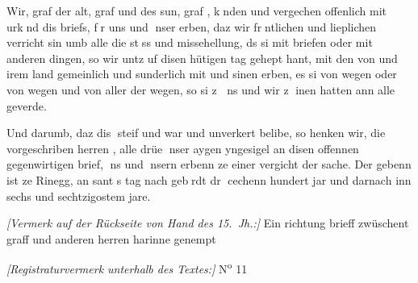 \documentclass[10pt,twoside]{article}
\begin{document}
\begin{source}

               
                  
                  
                     
                        Wir, graf 
                        der alt, graf  und
                           \leavevmode{}des sun, graf , knden und vergechen offenlich mit urknd dis briefs,
                        fr uns und nser erben, daz wir frntlichen und lieplichen verricht
                        sin umb alle die stss und missehellung, ds si mit briefen oder mit
                        anderen dingen, so wir untz uf disen hütigen tag gehept
                        hant, mit den von  und irem land
                        gemeinlich und sunderlich mit  und sinen erben, es si von  wegen oder von  wegen
                        und von aller der  wegen, so si
                        z ns und wir z inen hatten ann alle geverde.



                     Und darumb, daz dis  steif und
                        war und unverkert belibe, so henken wir, die vorgeschriben herren
                           , alle drüe nser aygen
                        yngesigel an disen offennen gegenwirtigen brief, ns und nsern
                        erbenn ze einer vergicht der sache. Der gebenn ist ze Rinegg, an sant
                              s tag nach  gebrdt dr cechenn hundert
                           jar und darnach inn sechs und sechtzigostem jare.



                  


               
               
               
                  \medskip
\noindent
{\small \textit{[Vermerk auf der Rückseite von Hand des 15.~Jh.:]} Ein richtung brieff zwüschent
                     graff 
                     und anderen herren harinne genempt \leavevmode{}}



               
               
                  \medskip
\noindent
{\small \textit{[Registraturvermerk unterhalb des Textes:]} N\textsuperscript{o} 11}



               
            
\end{source}










\printnotes*
\end{document}
